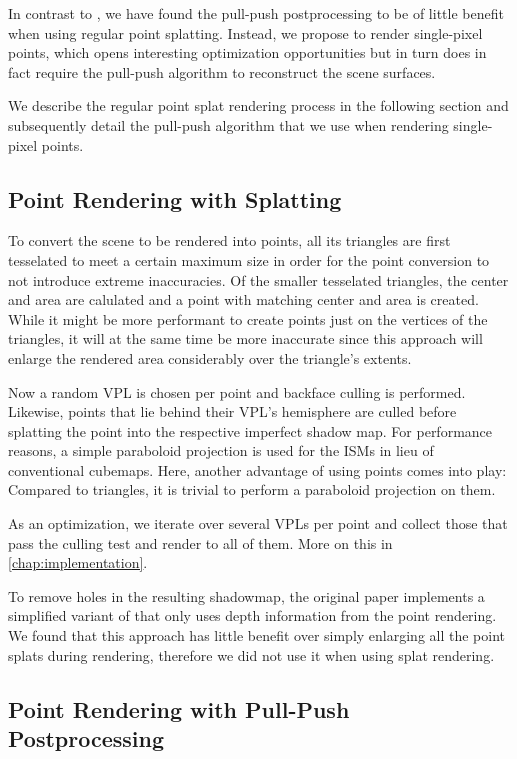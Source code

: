 In contrast to \cite{ritschel2008ism}, we have found the pull-push postprocessing to be of little benefit when using regular point splatting. Instead, we propose to render single-pixel points, which opens interesting optimization opportunities but in turn does in fact require the pull-push algorithm to reconstruct the scene surfaces.

We describe the regular point splat rendering process in the following section and subsequently detail the pull-push algorithm that we use when rendering single-pixel points.


\subsection{Point Rendering with Splatting}

To convert the scene to be rendered into points, all its triangles are first tesselated to meet a certain maximum size in order for the point conversion to not introduce extreme inaccuracies. Of the smaller tesselated triangles, the center and area are calulated and a point with matching center and area is created. While it might be more performant to create points just on the vertices of the triangles, it will at the same time be more inaccurate since this approach will enlarge the rendered area considerably over the triangle's extents.

Now a random VPL is chosen per point and backface culling is performed. Likewise, points that lie behind their VPL's hemisphere are culled before splatting the point into the respective imperfect shadow map. For performance reasons, a simple paraboloid projection is used for the ISMs in lieu of conventional cubemaps. Here, another advantage of using points comes into play: Compared to triangles, it is trivial to perform a paraboloid projection on them.

As an optimization, we iterate over several VPLs per point and collect those that pass the culling test and render to all of them. More on this in \cref{chap:implementation}.

To remove holes in the resulting shadowmap, the original paper implements a simplified variant of \cite{Marroquim:2007:reconstruction} that only uses depth information from the point rendering. We found that this approach has little benefit over simply enlarging all the point splats during rendering, therefore we did not use it when using splat rendering.



\subsection{Point Rendering with Pull-Push Postprocessing}

